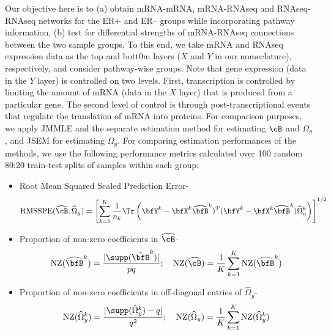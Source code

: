 Our objective here is to (a) obtain mRNA-mRNA, mRNA-RNAseq and RNAseq-RNAseq networks for the ER+ and ER-- groups while incorporating pathway information, (b) test for differential strengths of mRNA-RNAseq connections between the two sample groups. To this end, we take mRNA and RNAseq expression data as the top and bott0m layers ($X$ and $Y$ in our nomeclature), respectively, and consider pathway-wise groups. Note that gene expression (data in the $Y$ layer) is controlled on two levels. First, transcription is controlled by limiting the amount of mRNA (data in the $X$ layer) that is produced from a particular gene. The second level of control is through post-transcriptional events that regulate the translation of mRNA into proteins. For comparison purposes, we apply JMMLE and the separate estimation method \citet{LinEtal16} for estimating $\cB$ and $\Omega_y$, and JSEM for estimating $\Omega_y$. For comparing estimation performances of the methods, we use the following performance metrics calculated over 100 random 80:20 train-test splits of samples within each group:
%
\begin{itemize}
\item Root Mean Squared Scaled Prediction Error-
%
$$ \text{RMSSPE}(\widehat \cB, \widehat \Omega_y) = \left[
\sum_{k=1}^K \frac{1}{n_k} \Tr \left(\bfY^k - \bfX^k \widehat \bfB^k)^T (\bfY^k - \bfX^k \widehat \bfB^k)
\widehat\Omega_y^k \right)
\right]^{1/2} $$

\item Proportion of non-zero coefficients in $\widehat \cB$-
%
$$ \text{NZ}(\widehat \bfB^k) = \frac{| \supp(\hat \bfB^k) |}{pq}; \quad
\text{NZ}(\widehat \cB) = \frac{1}{K} \sum_{k=1}^K \text{NZ}(\widehat \bfB^k) $$

\item Proportion of non-zero coefficients in off-diagonal entries of $\widehat \Omega_y$-
%
$$ \text{NZ}(\widehat \Omega_y^k) = \frac{| \supp(\hat \Omega_y^k) - q|}{q^2}; \quad
\text{NZ}(\widehat \Omega_y) = \frac{1}{K} \sum_{k=1}^K \text{NZ}(\widehat \Omega_y^k) $$
\end{itemize}

